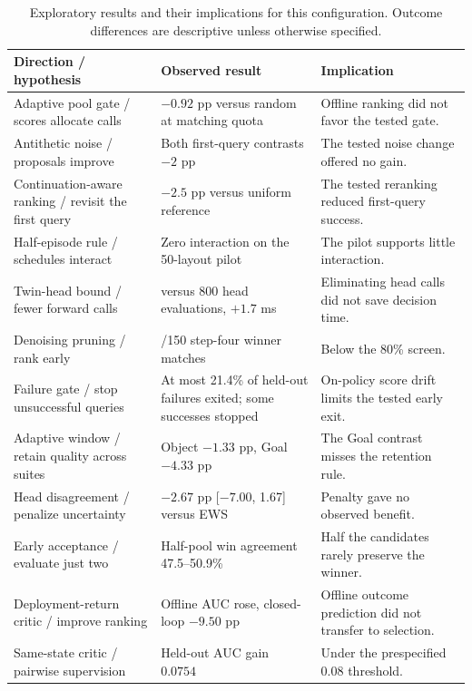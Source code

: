 \documentclass{article}
\begin{document}
\begin{table}[!ht]\centering\small
\caption{Exploratory results and their implications for this configuration.
Outcome differences are descriptive unless otherwise specified.}
\label{tab:negative}
\begin{tabularx}{\linewidth}{@{}>{\raggedright\arraybackslash}p{.23\linewidth}*{2}{>{\raggedright\arraybackslash}X}@{}}\toprule
Direction / hypothesis & Observed result & Implication \\
\midrule
Adaptive pool gate / scores allocate calls & $-0.92$ pp versus random at matching quota & Offline ranking did not favor the tested gate.\\
Antithetic noise / proposals improve & Both first-query contrasts $-2$ pp & The tested noise change offered no gain.\\
Continuation-aware ranking / revisit the first query & $-2.5$ pp versus uniform reference & The tested reranking reduced first-query success.\\
Half-episode rule / schedules interact & Zero interaction on the 50-layout pilot & The pilot supports little interaction.\\
Twin-head bound / fewer forward calls & 606 versus 800 head evaluations, $+1.7$ ms & Eliminating head calls did not save decision time.\\
Denoising pruning / rank early & 78/150 step-four winner matches & Below the 80\% screen.\\
Failure gate / stop unsuccessful queries & At most 21.4\% of held-out failures exited; some successes stopped & On-policy score drift limits the tested early exit.\\
Adaptive window / retain quality across suites & Object $-1.33$ pp, Goal $-4.33$ pp & The Goal contrast misses the retention rule.\\
Head disagreement / penalize uncertainty & $-2.67$ pp [$-7.00$, 1.67] versus EWS & Penalty gave no observed benefit.\\
Early acceptance / evaluate just two & Half-pool win agreement 47.5--50.9\% & Half the candidates rarely preserve the winner.\\
Deployment-return critic / improve ranking & Offline AUC rose, closed-loop $-9.50$ pp & Offline outcome prediction did not transfer to selection.\\
Same-state critic / pairwise supervision & Held-out AUC gain $0.0754$ & Under the prespecified $0.08$ threshold.\\
\bottomrule\end{tabularx}
\end{table}
\end{document}
